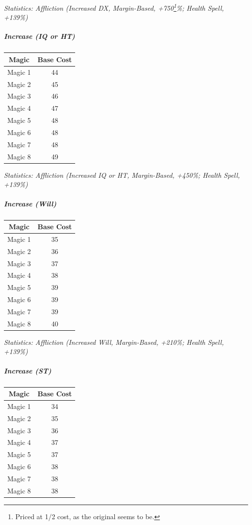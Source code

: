\begin{multicols*}{3}
	\textcolor{OliveGreen}{\textit{Statistics: Affliction (Increased DX, Margin-Based, +750\footnote{Priced at 1/2 cost, as the original seems to be.}\%; Health Spell, +139\%) }}
	
	\subparagraph{Increase (IQ or HT)}
	
	\begin{center}
		\begin{tabular}{|c|c|}
			\hline
			Magic & Base Cost \\
			\hline
			\hline
			Magic 1 & 44 \\
			Magic 2 & 45 \\
			Magic 3 & 46  \\
			Magic 4 & 47 \\
			Magic 5 & 48 \\
			Magic 6 & 48 \\
			Magic 7 & 48 \\
			Magic 8 & 49 \\
			\hline
		\end{tabular}
	\end{center}	
	
	\textcolor{OliveGreen}{\textit{Statistics: Affliction (Increased IQ or HT, Margin-Based, +450\%; Health Spell, +139\%) }}
	
	\subparagraph{Increase (Will)}
	
	\begin{center}
		\begin{tabular}{|c|c|}
			\hline
			Magic & Base Cost \\
			\hline
			\hline
			Magic 1 & 35 \\
			Magic 2 & 36 \\
			Magic 3 & 37 \\
			Magic 4 & 38 \\
			Magic 5 & 39 \\
			Magic 6 & 39 \\
			Magic 7 & 39 \\
			Magic 8 & 40 \\
			\hline
		\end{tabular}
	\end{center}	
	
	\textcolor{OliveGreen}{\textit{Statistics: Affliction (Increased Will, Margin-Based, +210\%; Health Spell, +139\%) }}
	
	
	\subparagraph{Increase (ST)}
	
	\begin{center}
		\begin{tabular}{|c|c|}
			\hline
			Magic & Base Cost \\
			\hline
			\hline
			Magic 1 & 34 \\
			Magic 2 & 35 \\
			Magic 3 & 36 \\
			Magic 4 & 37 \\
			Magic 5 & 37 \\
			Magic 6 & 38 \\
			Magic 7 & 38 \\
			Magic 8 & 38 \\
			\hline
		\end{tabular}
	\end{center}	
	

\end{multicols*}
